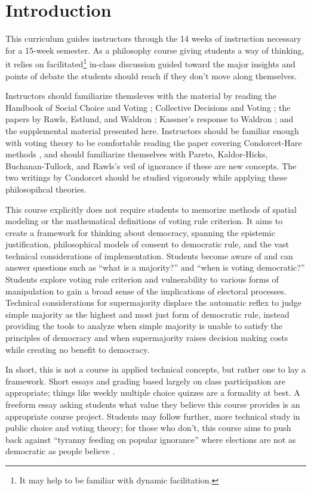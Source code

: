 \chapter{Introduction}
This curriculum guides instructors through the 14 weeks of instruction necessary for a 15-week semester.  As a philosophy course giving students a way of thinking, it relies on facilitated\footnote{It may help to be familiar with dynamic facilitation.} in-class discussion guided toward the major insights and points of debate the students should reach if they don't move along themselves.

Instructors should familiarize themsleves with the material by reading the Handbook of Social Choice and Voting \autocite{Heckelman2015}; Collective Decisions and Voting \autocite{Tideman2006}; the papers by Rawls, Estlund, and Waldron \autocite{Rawls1997,Estlund2008,Waldron1998}; Kassner's response to Waldron \autocite{Kassner2006}; and the supplemental material presented here.  Instructors should be familiar enough with voting theory to be comfortable reading the paper covering Condorcet-Hare methods \autocite{GreenArmytage2011}, and should familiarize themselves with Pareto, Kaldor-Hicks, Buchanan-Tullock, and Rawls's veil of ignorance if these are new concepts.  The two writings by Condorcet should be studied vigorously \autocite{Condorcet1781,Condorcet1789} while applying these philosopihcal theories.

This course explicitly does not require students to memorize methods of spatial modeling or the mathematical definitions of voting rule criterion.  It aims to create a framework for thinking about democracy, spanning the epistemic justification, philosophical models of consent to democratic rule, and the vast technical considerations of implementation.  Students become aware of and can answer questions such as ``what is a majority?'' and ``when is voting democratic?''  Students explore voting rule criterion and vulnerability to various forms of manipulation to gain a broad sense of the implications of electoral processes.  Technical considerations for supermajority displace the automatic reflex to judge simple majority as the highest and most just form of democratic rule, instead providing the tools to analyze when simple majority is unable to satisfy the principles of democracy and when supermajority raises decision making costs while creating no benefit to democracy.

In short, this is not a course in applied technical concepts, but rather one to lay a framework.  Short essays and grading based largely on class participation are appropriate; things like weekly multiple choice quizzes are a formality at best.  A freeform essay asking students what value they believe this course provides is an appropriate course project.  Students may follow further, more technical study in public choice and voting theory; for those who don't, this course aims to push back against ``tyranny feeding on popular ignorance'' where elections are not as democratic as people believe \autocite{Yastrebtseva2015}.